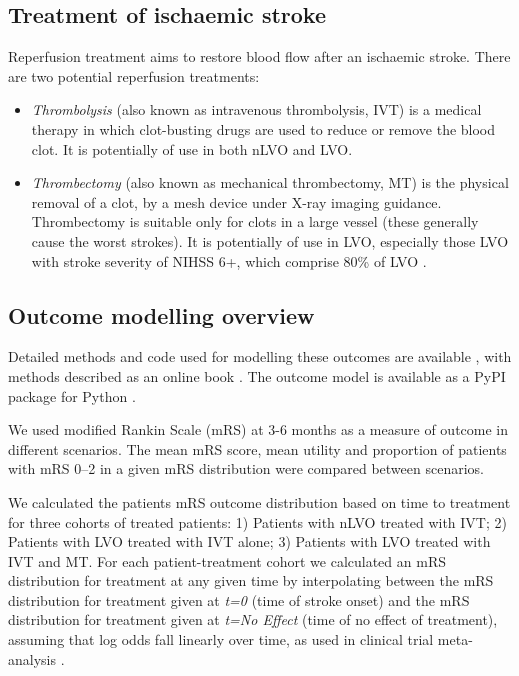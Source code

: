 \subsection{Treatment of ischaemic stroke}

Reperfusion treatment aims to restore blood flow after an ischaemic stroke. There are two potential reperfusion treatments:

\begin{itemize}
    \item \textit{Thrombolysis} (also known as intravenous thrombolysis, IVT) is a medical therapy in which clot-busting drugs are used to reduce or remove the blood clot. It is potentially of use in both nLVO and LVO.
    
    \item \textit{Thrombectomy} (also known as mechanical thrombectomy, MT) is the physical removal of a clot, by a mesh device under X-ray imaging guidance. Thrombectomy is suitable only for clots in a large vessel (these generally cause the worst strokes). It is potentially of use in LVO, especially those LVO with stroke severity of NIHSS 6+, which comprise 80\% of LVO \cite{mcmeekin_estimating_2017}.
\end{itemize}


\subsection{Outcome modelling overview}

Detailed methods and code used for modelling these outcomes are available \cite{github2}, with methods described as an online book \cite{github3}. The outcome model is available as a PyPI package for Python \cite{pypi}.

We used modified Rankin Scale (mRS) at 3-6 months as a measure of outcome in different scenarios. The mean mRS score, mean utility and proportion of patients with mRS 0--2 in a given mRS distribution were compared between scenarios.

We calculated the patients mRS outcome distribution based on time to treatment for three cohorts of treated patients: 1) Patients with nLVO treated with IVT; 2) Patients with LVO treated with IVT alone; 3) Patients with LVO treated with IVT and MT. For each patient-treatment cohort we calculated an mRS distribution for treatment at any given time by interpolating between the mRS distribution for treatment given at \emph{t=0} (time of stroke onset) and the mRS distribution for treatment given at \emph{t=No Effect} (time of no effect of treatment), assuming that log odds fall linearly over time, as used in clinical trial meta-analysis \cite{emberson_effect_2014, fransen_time_2016}.

